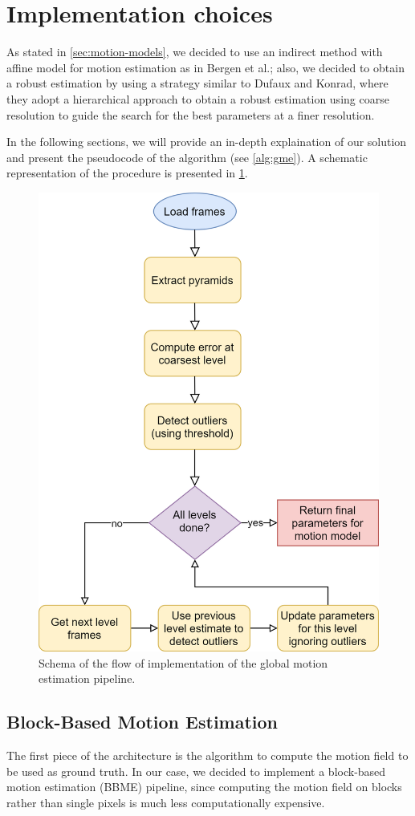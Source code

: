 \section{Implementation choices}
\label{sec:03-implementation}

As stated in \cref{sec:motion-models}, we decided to use an indirect method with affine model for motion estimation as in Bergen et al.\cite{Bergen92}; also, we decided to obtain a robust estimation by using a strategy similar to Dufaux and Konrad\cite{Dufeaux2000}, where they adopt a hierarchical approach to obtain a robust estimation using coarse resolution to guide the search for the best parameters at a finer resolution.

In the following sections, we will provide an in-depth explaination of our solution and present the pseudocode of the algorithm (see \cref{alg:gme}). A schematic representation of the procedure is presented in \cref{fig:implementation-flow}.

\begin{figure}
    \centering
    \includegraphics[width=.7\linewidth]{../assets/images/implementation-flow.png}
    \caption{Schema of the flow of implementation of the global motion estimation pipeline.}
    \label{fig:implementation-flow}
\end{figure}

\subsection{Block-Based Motion Estimation}
\label{sec:BBME}
The first piece of the architecture is the algorithm to compute the motion field to be used as ground truth.
In our case, we decided to implement a block-based motion estimation (BBME) pipeline, since computing the motion field on blocks rather than single pixels is much less computationally expensive.

